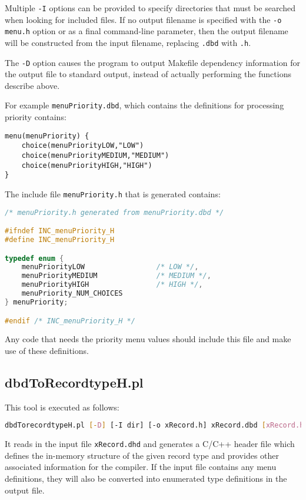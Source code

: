 Multiple \verb|-I| options can be provided to specify directories that must be searched when looking for included files.
If no output filename is specified with the \verb|-o menu.h| option or as a final command-line parameter, then the output filename will be constructed from the input filename, replacing \verb|.dbd| with \verb|.h|.

The \verb|-D| option causes the program to output Makefile dependency information for the output file to standard output, instead of actually performing the functions describe above.

For example \verb|menuPriority.dbd|, which contains the definitions for processing priority contains:

\begin{verbatim}
menu(menuPriority) {
    choice(menuPriorityLOW,"LOW")
    choice(menuPriorityMEDIUM,"MEDIUM")
    choice(menuPriorityHIGH,"HIGH")
}
\end{verbatim}

The include file \verb|menuPriority.h| that is generated contains:

\begin{lstlisting}[language=C]
/* menuPriority.h generated from menuPriority.dbd */

#ifndef INC_menuPriority_H
#define INC_menuPriority_H

typedef enum {
    menuPriorityLOW                 /* LOW */,
    menuPriorityMEDIUM              /* MEDIUM */,
    menuPriorityHIGH                /* HIGH */,
    menuPriority_NUM_CHOICES
} menuPriority;

#endif /* INC_menuPriority_H */
\end{lstlisting}

Any code that needs the priority menu values should include this file and make use of these definitions.

\subsection{dbdToRecordtypeH.pl}

This tool is executed as follows:

\begin{lstlisting}[language=sh]
dbdTorecordtypeH.pl [-D] [-I dir] [-o xRecord.h] xRecord.dbd [xRecord.h]
\end{lstlisting}

It reads in the input file \verb|xRecord.dhd| and generates a C/C++ header file which defines the in-memory structure of the given record type and provides other associated information for the compiler.
If the input file contains any menu definitions, they will also be converted into enumerated type definitions in the output file.

